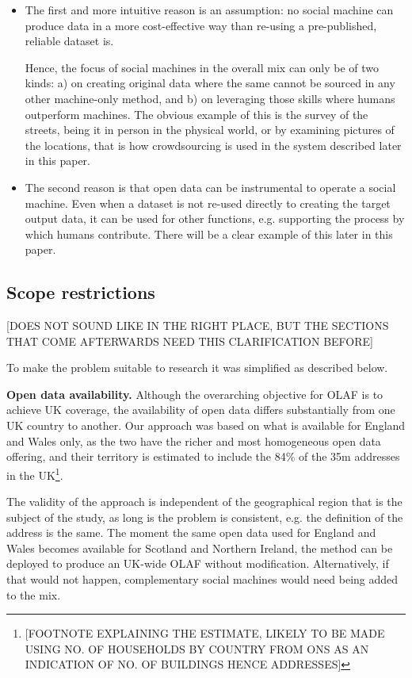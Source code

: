     \begin{itemize}

        \item The first and more intuitive reason is an assumption: no social machine can produce data in a more cost-effective way than re-using a pre-published, reliable dataset is.  
        
        Hence, the focus of social machines in the overall mix can only be of two kinds: a) on creating original data where the same cannot be sourced in any other machine-only method, and b) on leveraging those skills where humans outperform machines. The obvious example of this is the survey of the streets, being it in person in the physical world, or by examining pictures of the locations, that is how crowdsourcing is used in the system described later in this paper.

        \item The second reason is that open data can be instrumental to operate a social machine. Even when a dataset is not re-used directly to creating the target output data, it can be used for other functions, e.g. supporting the process by which humans contribute. There will be a clear example of this later in this paper. 

    \end{itemize}

\subsection{Scope restrictions}
    
    [DOES NOT SOUND LIKE IN THE RIGHT PLACE, BUT THE SECTIONS THAT COME AFTERWARDS NEED THIS CLARIFICATION BEFORE] 
    
    To make the problem suitable to research it was simplified as described below. 
    
    \textbf{Open data availability.} Although the overarching objective for OLAF is to achieve UK coverage, the availability of open data differs substantially from one UK country to another. Our approach was based on what is available for England and Wales only, as the two have the richer and most homogeneous open data offering, and their territory is estimated to include the 84\% of the 35m addresses in the UK\footnote{[FOOTNOTE EXPLAINING THE ESTIMATE, LIKELY TO BE MADE USING NO. OF HOUSEHOLDS BY COUNTRY FROM ONS AS AN INDICATION OF NO. OF BUILDINGS HENCE ADDRESSES]}.
    
    The validity of the approach is independent of the geographical region that is the subject of the study, as long is the problem is consistent, e.g. the definition of the address is the same. The moment the same open data used for England and Wales becomes available for Scotland and Northern Ireland, the method can be deployed to produce an UK-wide OLAF without modification. Alternatively, if that would not happen, complementary social machines would need being added to the mix.
    
